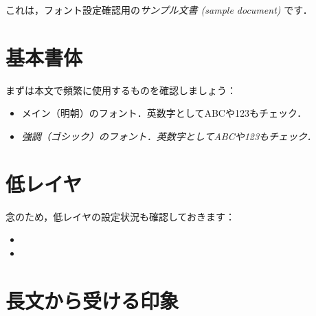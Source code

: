 \documentclass[autodetect-engine, dvi=dvipdfmx, fleqn]{wtarticle}
\begin{document}
\maketitle

これは，フォント設定確認用の\emph{サンプル文書 (sample document) }です．

\section{基本書体}

まずは本文で頻繁に使用するものを確認しましょう：
%
\begin{itemize}
\item メイン（明朝）のフォント．英数字としてABCや123もチェック．
\item \emph{強調（ゴシック）のフォント．英数字としてABCや123もチェック．}
\end{itemize}

\section{低レイヤ}

念のため，低レイヤの設定状況も確認しておきます：
%
\begin{itemize}
\item {}
\item {}
\end{itemize}

\section{長文から受ける印象}

\emph{}
\end{document}
